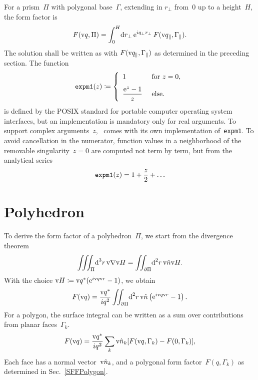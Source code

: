 For a prism~$\Pi$ with polygonal base~$\Gamma$,
extending in $r_\perp$ from~0 up to a height~$H$,
the form factor is
\begin{equation}
  F(\text{v}{q},\Pi)
  = \int_0^H\!\text{d} r_\perp\,\text{e}^{i q_\perp r_\perp}\,F(\text{v}{q}_\parallel,\Gamma_\parallel).
\end{equation}
The solution shall be written as
with $F(\text{v}{q}_\parallel,\Gamma_\parallel)$ as determined in the preceding section.
The function
\begin{equation}
  \text{\texttt{expm1}}(z) \coloneqq
  \left\{ \begin{array}{ll}
    1&\text{~for~}z=0,\\[1.8ex]
    \displaystyle \frac{\text{e}^{z}-1}{z}&\text{~else.}
    \end{array}\right.
\end{equation}
is defined by the POSIX standard for portable computer operating system interfaces,
but an implementation is mandatory only for real arguments.
To support complex arguments~$z$,
\BornAgain\ comes with its own implementation of~\texttt{expm1}.
To avoid cancellation in the numerator,
function values in a neighborhood of the removable singularity~$z=0$
are computed not term by term,
but from the analytical series
\begin{equation}
  \text{\texttt{expm1}}(z) = 1 + \frac{z}{2} + \ldots
\end{equation}

%
%

\section{Polyhedron}\label{SFFPolyhedron}

To derive the form factor of a polyhedron~$\Pi$,
we start from the divergence theorem
\begin{equation}
  \iiint_\Pi\!\text{d}^3r\,\text{v}{\nabla}\text{v}{H} = \iint_{\partial\Pi}\!\text{d}^2r\, \text{v}{\hat n}\text{v}{H}.
\end{equation}
With the choice $\text{v}{H}\coloneqq\text{v}{q}^*(\text{e}^{i\text{v}{q}\text{v}{r}}-1)$,
we obtain
\begin{equation}
  F(\text{v}{q}) = \frac{\text{v}{q}^*}{iq^2} \iint_{\partial\Pi}\!\text{d}^2r\, \text{v}{\hat n} \left(\text{e}^{i\text{v}{q}\text{v}{r}}-1\right).
\end{equation}
For a polygon, the surface integral can be written
as a sum over contributions from planar faces~$\Gamma_k$.
\begin{equation}
  F(\text{v}{q}) = \frac{\text{v}{q}^*}{iq^2} \sum_k \text{v}{\hat n}_k [F(\text{v}{q},\Gamma_k)-F(0,\Gamma_k)],
\end{equation}
Each face has a normal vector~$\text{v}{\hat n}_k$, 
and a polygonal form factor~$F(q,\Gamma_k)$ as determined in Sec.~\ref{SFFPolygon}.


